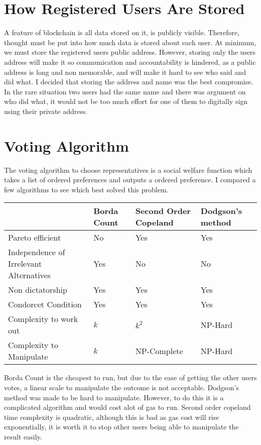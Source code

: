 \section{How Registered Users Are Stored}
A feature of blockchain is all data stored on it, is publicly visible. Therefore, thought must be put into how much data is stored about each user. At minimum, we must store the registered users public address. However, storing only the users address will make it so communication and accountability is hindered, as a public address is long and non memorable, and will make it hard to see who said and did what. I decided that storing the address and name was the best compromise. In the rare situation two users had the same name and there was argument on who did what, it would not be too much effort for one of them to digitally sign using their private address.
\section{Voting Algorithm}
The voting algorithm to choose representatives is a social welfare function which takes a list of ordered preferences and outputs a ordered preference. I compared a few algorithms to see which best solved this problem.
\begin{center}
 \begin{tabular}{|p{5cm}|p{3cm}|p{3cm}|p{3cm}|}
 \hline
  & Borda Count & Second Order Copeland & Dodgson’s method \\
 \hline
 Pareto efficient & No &  Yes & Yes\\
 \hline
 Independence of Irrelevant Alternatives & Yes & No & No \\
 \hline
 Non dictatorship & Yes & Yes & Yes \\
 \hline
 Condorcet Condition & Yes & Yes & Yes\\
 \hline
 Complexity to work out & $k$ & $k^2$ & NP-Hard\\
 \hline
Complexity to Manipulate  & $k$ & NP-Complete & NP-Hard \\
 \hline
\end{tabular}
\end{center}
Borda Count is the cheapest to run, but due to the ease of getting the other users votes, a linear scale to manipulate the outcome is not acceptable. Dodgson’s method was made to be hard to manipulate. However, to do this it is a complicated algorithm and would cost alot of gas to run. Second order copeland time complexity is quadratic, although this is bad as gas cost will rise exponentially, it is worth it to stop other users being able to manipulate the result easily.
